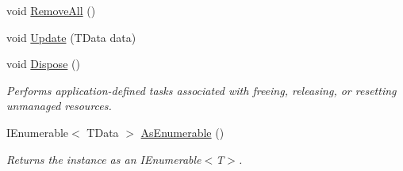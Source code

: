 \begin{DoxyCompactItemize}
void \hyperlink{classCqrs_1_1Azure_1_1DocumentDb_1_1DataStores_1_1AzureDocumentDbDataStore_a0d72cc318e98e01b3dbed86d412a8778_a0d72cc318e98e01b3dbed86d412a8778}{Remove\+All} ()
\item 
void \hyperlink{classCqrs_1_1Azure_1_1DocumentDb_1_1DataStores_1_1AzureDocumentDbDataStore_a55f504ed5094e3041a266b958424b1a2_a55f504ed5094e3041a266b958424b1a2}{Update} (T\+Data data)
\item 
void \hyperlink{classCqrs_1_1Azure_1_1DocumentDb_1_1DataStores_1_1AzureDocumentDbDataStore_ade945ac02451a490711367dbe54d4132_ade945ac02451a490711367dbe54d4132}{Dispose} ()
\begin{DoxyCompactList}\small\item\em Performs application-\/defined tasks associated with freeing, releasing, or resetting unmanaged resources. \end{DoxyCompactList}\item 
I\+Enumerable$<$ T\+Data $>$ \hyperlink{classCqrs_1_1Azure_1_1DocumentDb_1_1DataStores_1_1AzureDocumentDbDataStore_acbe24a7d0def44ca4826bbf5658a6054_acbe24a7d0def44ca4826bbf5658a6054}{As\+Enumerable} ()
\begin{DoxyCompactList}\small\item\em Returns the instance as an I\+Enumerable$<$\+T$>$. \end{DoxyCompactList}\end{DoxyCompactItemize}

